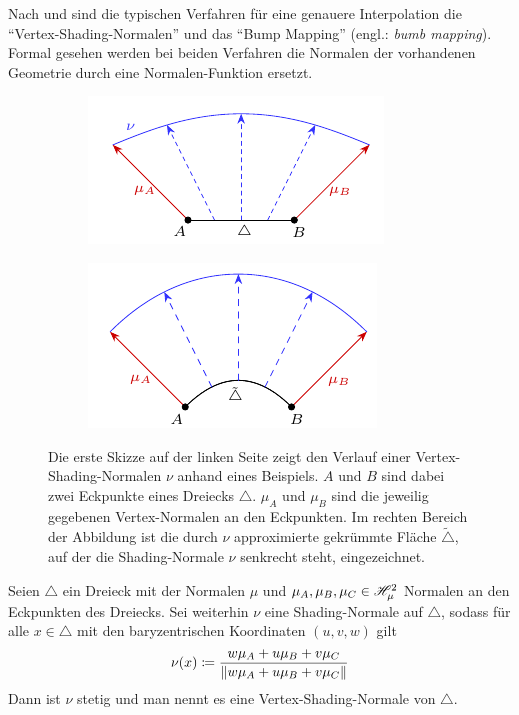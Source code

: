 		Nach \cite[S.~166,~584~ff]{pbrt3} und \cite[S.~38~ff,~183~ff]{real-time-render} sind die typischen Verfahren für eine genauere Interpolation die \enquote{Vertex-Shading-Normalen} und das \enquote{Bump Mapping} (engl.: \textit{bumb mapping}).
		Formal gesehen werden bei beiden Verfahren die Normalen der vorhandenen Geometrie durch eine Normalen-Funktion ersetzt.
		\begin{figure}[h]
			\begin{subfigure}[b]{0.5\textwidth}
				\center
				\includegraphics{gg_fig/scheme_normal-function_1.pdf}
			\end{subfigure}
			\begin{subfigure}[b]{0.5\textwidth}
				\center
				\includegraphics{gg_fig/scheme_normal-function_2.pdf}
			\end{subfigure}
			\caption{Die erste Skizze auf der linken Seite zeigt den Verlauf einer Vertex-Shading-Normalen $\nu$ anhand eines Beispiels. $A$ und $B$ sind dabei zwei Eckpunkte eines Dreiecks $\triangle$. $\mu_A$ und $\mu_B$ sind die jeweilig gegebenen Vertex-Normalen an den Eckpunkten. Im rechten Bereich der Abbildung ist die durch $\nu$ approximierte gekrümmte Fläche $\tilde{\triangle}$, auf der die Shading-Normale $\nu$ senkrecht steht, eingezeichnet.}
			\label{fig:normal-function}
		\end{figure}

		\begin{definition}
			Seien $\triangle$ ein Dreieck mit der Normalen $\mu$ und $\mu_A, \mu_B, \mu_C \in \mathscr{H}^{2}_{\mu}$ Normalen an den Eckpunkten des Dreiecks.
			Sei weiterhin $\nu$ eine Shading-Normale auf $\triangle$, sodass für alle $x\in \triangle$ mit den baryzentrischen Koordinaten $(u,v,w)$ gilt
			\[
				\nu(x) \coloneqq \frac{w\mu_A + u\mu_B + v\mu_C}{\left\| w\mu_A + u\mu_B + v\mu_C \right\|}
			\]
			Dann ist $\nu$ stetig und man nennt es eine Vertex-Shading-Normale von $\triangle$.
		\end{definition}

